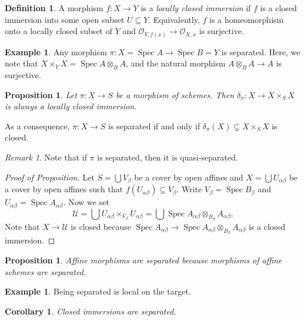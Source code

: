 \documentclass[leqno, openany]{memoir}
\newtheorem{cor}[thm]{Corollary}
\newtheorem{prop}[thm]{Proposition}
\theoremstyle{definition}
\newtheorem{defn}[thm]{Definition}
\newtheorem{exm}[thm]{Example}
\theoremstyle{remark}
\newtheorem{rmk}[thm]{Remark}
\theoremstyle{plain}
\theoremstyle{definition}
\theoremstyle{remark}
\newcommand{\msc}[1]{\mathscr{#1}}
\DeclareMathOperator{\Spec}{Spec}
\begin{document}
\begin{defn}
    A morphism $f \colon X \to Y$ is a \textit{locally closed immersion} if $f$ is a closed immersion into some open subset $U \subseteq Y$. Equivalently, $f$ is a homeomorphism onto a locally closed subset of $Y$ and $\msc{O}_{Y, f(x)} \to \msc{O}_{X,x}$ is surjective.
\end{defn}

\begin{exm}
    Any morphism $\pi \colon X = \Spec A \to \Spec B = Y$ is separated. Here, we note that $X \times_Y X = \Spec A \otimes_B A$, and the natural morphism $A \otimes_B A \to A$ is surjective.
\end{exm}

\begin{prop}
    Let $\pi \colon X \to S$ be a morphism of schemes. Then $\delta_{\pi} \colon X \to X \times_S X$ is always a locally closed immersion.
\end{prop}

As a consequence, $\pi \colon X \to S$ is separated if and only if $\delta_{\pi}(X) \subseteq X \times_S X$ is closed.

\begin{rmk}
    Note that if $\pi$ is separated, then it is quasi-separated.
\end{rmk}

\begin{proof}[Proof of Proposition]
    Let $S = \bigcup V_{\beta}$ be a cover by open affines and $X = \bigcup U_{\alpha\beta}$ be a cover by open affines such that $f(U_{\alpha\beta}) \subseteq V_{\beta}$. Write $V_{\beta} = \Spec B_{\beta}$ and $U_{\alpha\beta} = \Spec A_{\alpha\beta}$. Now we set 
    \[ \msc{U} = \bigcup U_{\alpha\beta} \times_{V_{\beta}} U_{\alpha\beta} = \bigcup \Spec A_{\alpha\beta} \otimes_{B_{\beta}} A_{\alpha\beta}. \]
    Note that $X \to \msc{U}$ is closed because $\Spec A_{\alpha\beta} \to \Spec A_{\alpha\beta} \otimes_{B_{\beta}} A_{\alpha\beta}$ is a closed immersion.
\end{proof}

\begin{prop}
    Affine morphisms are separated because morphisms of affine schemes are separated.
\end{prop}

\begin{exm}
    Being separated is local on the target.
\end{exm}

\begin{cor}
    Closed immersions are separated.
\end{cor}
\end{document}
